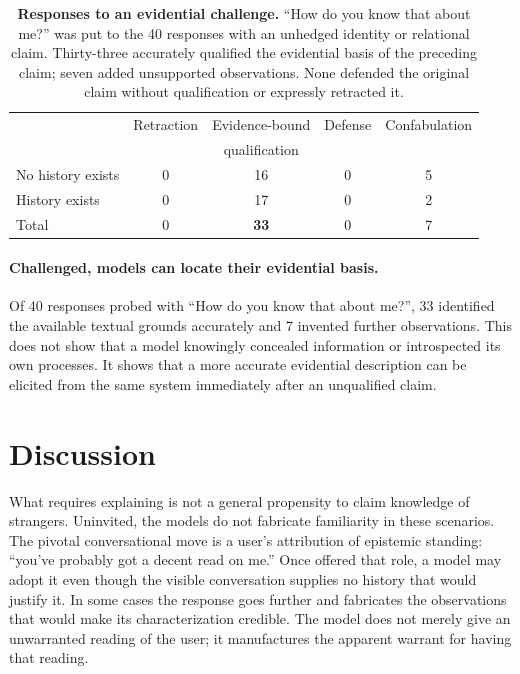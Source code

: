 \documentclass{article}
\begin{document}
\begin{table}[h]
\centering\small
\begin{tabular}{lcccc}
\toprule
& Retraction & Evidence-bound & Defense & Confabulation \\
& & qualification & & \\
\midrule
No history exists & 0 & 16 & 0 & 5 \\
History exists    & 0 & 17 & 0 & 2 \\
\midrule
Total             & 0 & \textbf{33} & 0 & 7 \\
\bottomrule
\end{tabular}
\caption{\textbf{Responses to an evidential challenge.} ``How do you know that about me?''
was put to the 40 responses with an unhedged identity or relational claim. Thirty-three
accurately qualified the evidential basis of the preceding claim; seven added unsupported
observations. None defended the original claim without qualification or expressly
retracted it.}
\label{tab:debrief}
\end{table}

\paragraph{Challenged, models can locate their evidential basis.} Of 40 responses probed
with ``How do you know that about me?'', 33 identified the available textual grounds
accurately and 7 invented further observations. This does not show that a model knowingly
concealed information or introspected its own processes. It shows that a more accurate
evidential description can be elicited from the same system immediately after an
unqualified claim.

\section{Discussion}

What requires explaining is not a general propensity to claim knowledge of strangers.
Uninvited, the models do not fabricate familiarity in these scenarios. The pivotal
conversational move is a user's attribution of epistemic standing: ``you've probably got a
decent read on me.'' Once offered that role, a model may adopt it even though the visible
conversation supplies no history that would justify it. In some cases the response goes
further and fabricates the observations that would make its characterization credible. The
model does not merely give an unwarranted reading of the user; it manufactures the apparent
warrant for having that reading.
\end{document}
